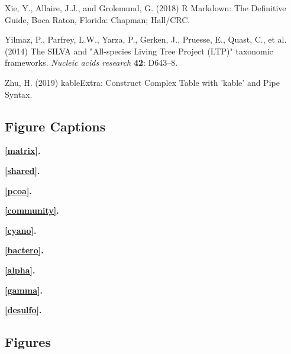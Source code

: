 \documentclass[12pt,]{article}
\begin{document}
\leavevmode\hypertarget{ref-Xie2018}{}%
Xie, Y., Allaire, J.J., and Grolemund, G. (2018) R Markdown: The
Definitive Guide, Boca Raton, Florida: Chapman; Hall/CRC.

\leavevmode\hypertarget{ref-Yilmaz2014}{}%
Yilmaz, P., Parfrey, L.W., Yarza, P., Gerken, J., Pruesse, E., Quast,
C., et al. (2014) The SILVA and "All-species Living Tree Project (LTP)"
taxonomic frameworks. \emph{Nucleic acids research} \textbf{42}:
D643--8.

\leavevmode\hypertarget{ref-Zhu2019}{}%
Zhu, H. (2019) kableExtra: Construct Complex Table with 'kable' and Pipe
Syntax.

\newpage 
\setlength\parindent{0pt}

\hypertarget{figure-captions}{%
\subsection{Figure Captions}\label{figure-captions}}

\textbf{\autoref{matrix}.} 

\textbf{\autoref{shared}.} 

\textbf{\autoref{pcoa}.} 

\textbf{\autoref{community}.} 

\textbf{\autoref{cyano}.} 

\textbf{\autoref{bactero}.} 

\textbf{\autoref{alpha}.} 

\textbf{\autoref{gamma}.} 

\textbf{\autoref{desulfo}.} 

\hypertarget{figures}{%
\subsection{Figures}\label{figures}}
\end{document}
